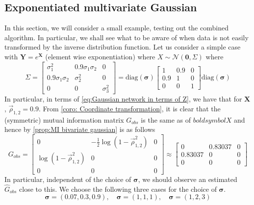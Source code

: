 \documentclass[../Thesis.tex]{subfiles}
\begin{document}
\subsection{Exponentiated multivariate Gaussian}\label{ex:1}
In this section, we will consider a small example, testing out the combined algorithm. In particular, we shall see what to be aware of when data is not easily transformed by the inverse distribution function. Let us consider a simple case with $\mathbf{Y} = e^{\mathbf{X}}$ (element wise exponentiation) where $X \sim \mathcal{N}\left(\mathbf{0}, \Sigma\right)$ where
\begin{equation}\label{eq:Results - 3x3 example - Sigma structure}
    \Sigma = \begin{bmatrix}
        \sigma_1^2           & 0.9\sigma_1\sigma_2 & 0          \\
        0.9 \sigma_1\sigma_2 & \sigma_2^2          & 0          \\
        0                    & 0                   & \sigma_3^2
    \end{bmatrix} = \text{diag}\left(\boldsymbol \sigma \right) \begin{bmatrix}
        1   & 0.9 & 0 \\
        0.9 & 1   & 0 \\
        0   & 0   & 1
    \end{bmatrix} \text{diag}\left(\boldsymbol \sigma \right)
\end{equation}
In particular, in terms of \autoref{eq:Gaussian network in terms of Z}, we have that for $\boldsymbol X$, $\vec{\rho}_{1,2} = 0.9$. From \autoref{coro: Coordinate transformation}, it is clear that the (symmetric) mutual information matrix $G_{obs}$ is the same as of $boldsymbol X$ and hence by \autoref{prop:MI bivariate gaussian} is as follows
$$G_{obs} = \begin{bmatrix}
        0                                        & -\frac{1}{2} \log \left(1 - \vec{\rho}_{1,2}^2\right) & 0 \\
        \log \left(1 - \vec{\rho}_{1,2}^2\right) & 0                                                     & 0 \\
        0                                        & 0                                                     & 0
    \end{bmatrix} \approx \begin{bmatrix}
        0       & 0.83037 & 0 \\
        0.83037 & 0       & 0 \\
        0       & 0       & 0
    \end{bmatrix}$$
In particular, independent of the choice of $\boldsymbol \sigma$, we should observe an estimated $\hat{G}_{obs}$ close to this. We choose the following three cases for the choice of $\boldsymbol \sigma$.
$$
    \boldsymbol\sigma = (0.07, 0.3, 0.9), \quad
    \boldsymbol\sigma = (1,1,1), \quad
    \boldsymbol\sigma = (1,2,3)
$$
\end{document}
